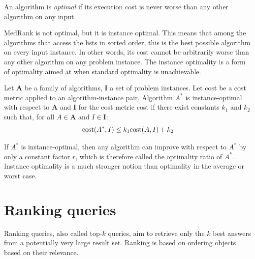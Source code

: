 \documentclass[12pt, a4paper]{report}
\newtheorem[style=M,bodystyle=\normalfont]{theorem}{Theorem}
\newtheorem[style=M,bodystyle=\normalfont]{corollary}{Corollary}
\newtheorem[style=M,bodystyle=\normalfont]{lemma}{Lemma}
\newtheorem[style=M,bodystyle=\normalfont]{definition}{Definition}
\begin{document}
    \begin{definition}
        An algorithm is \emph{optimal} if its execution cost is never worse than any other algorithm on any input.
    \end{definition}
    MedRank is not optimal, but it is instance optimal. This means that among the algorithms that access the lists in sorted order, this is the best possible algorithm on every 
    input instance. In other words, its cost cannot be arbitrarily worse than any other algorithm on any problem instance. The instance optimality is a form of optimality aimed 
    at when standard optimality is unachievable. 
    \begin{definition}
        Let $\textbf{A}$ be a family of algorithms, $\textbf{I}$ a set of problem instances. Let cost be a cost metric applied to an algorithm-instance pair. Algorithm 
        $A^{*}$ is instance-optimal with respect to $\textbf{A}$ and $\textbf{I}$ for the cost metric cost if there exist constants $k_1$ and $k_2$ such that, for all 
        $A \in \textbf{A}$ and $I \in \textbf{I}$: 
        \[\textnormal{cost}(A^{*}, I) \leq k_1 \textnormal{cost}(A, I) + k_2\]
    \end{definition}
    If $A^{*}$ is instance-optimal, then any algorithm can improve with respect to $A^{*}$ by only a constant factor $r$, which is therefore called the optimality ratio of $A^{*}$. 
    Instance optimality is a much stronger notion than optimality in the average or worst case. 

    \section{Ranking queries}
    Ranking queries, also called top-$k$ queries, aim to retrieve only the $k$ best answers from a potentially very large result set. Ranking is based on ordering objects based on their relevance.
\end{document}
